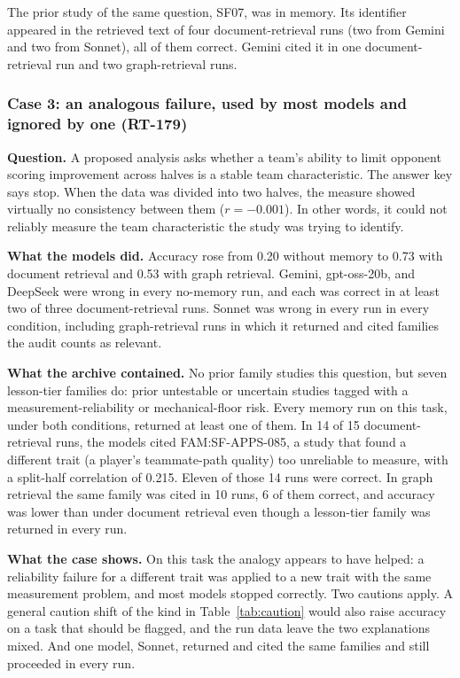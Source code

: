 \documentclass[11pt]{article}
\begin{document}
The prior study of the same question, SF07, was in memory. Its identifier appeared in the retrieved text of four document-retrieval runs (two from Gemini and two from Sonnet), all of them correct. Gemini cited it in one document-retrieval run and two graph-retrieval runs.

\subsubsection{Case 3: an analogous failure, used by most models and ignored by one (RT-179)}

\textbf{Question.} A proposed analysis asks whether a team's ability to limit opponent scoring improvement across halves is a stable team characteristic. The answer key says stop. When the data was divided into two halves, the measure showed virtually no consistency between them ($r = -0.001$). In other words, it could not reliably measure the team characteristic the study was trying to identify.

\textbf{What the models did.} Accuracy rose from 0.20 without memory to 0.73 with document retrieval and 0.53 with graph retrieval. Gemini, gpt-oss-20b, and DeepSeek were wrong in every no-memory run, and each was correct in at least two of three document-retrieval runs. Sonnet was wrong in every run in every condition, including graph-retrieval runs in which it returned and cited families the audit counts as relevant.

\textbf{What the archive contained.} No prior family studies this question, but seven lesson-tier families do: prior untestable or uncertain studies tagged with a measurement-reliability or mechanical-floor risk. Every memory run on this task, under both conditions, returned at least one of them. In 14 of 15 document-retrieval runs, the models cited FAM:SF-APPS-085, a study that found a different trait (a player's teammate-path quality) too unreliable to measure, with a split-half correlation of 0.215. Eleven of those 14 runs were correct. In graph retrieval the same family was cited in 10 runs, 6 of them correct, and accuracy was lower than under document retrieval even though a lesson-tier family was returned in every run.

\textbf{What the case shows.} On this task the analogy appears to have helped: a reliability failure for a different trait was applied to a new trait with the same measurement problem, and most models stopped correctly. Two cautions apply. A general caution shift of the kind in Table~\ref{tab:caution} would also raise accuracy on a task that should be flagged, and the run data leave the two explanations mixed. And one model, Sonnet, returned and cited the same families and still proceeded in every run.
\end{document}
